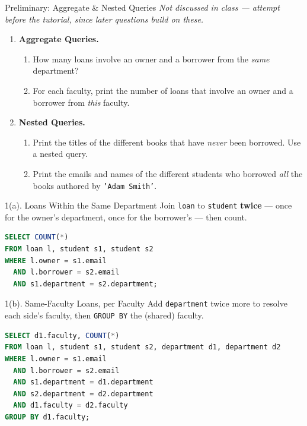 \documentclass{beamer}
\begin{document}
\begin{frame}{Preliminary: Aggregate \& Nested Queries}
\small
\textit{Not discussed in class --- attempt before the tutorial, since later questions build on these.}
\begin{enumerate}
  \item[\textbf{1.}] \textbf{Aggregate Queries.}
  \begin{enumerate}
    \item[(a)] How many loans involve an owner and a borrower from the \emph{same} department?
    \item[(b)] For each faculty, print the number of loans that involve an owner and a borrower from \emph{this} faculty.
  \end{enumerate}
  \item[\textbf{2.}] \textbf{Nested Queries.}
  \begin{enumerate}
    \item[(a)] Print the titles of the different books that have \emph{never} been borrowed. Use a nested query.
    \item[(b)] Print the emails and names of the different students who borrowed \emph{all} the books authored by \texttt{'Adam Smith'}.
  \end{enumerate}
\end{enumerate}
\end{frame}

\begin{frame}[fragile]{1(a). Loans Within the Same Department}
\small
Join \texttt{loan} to \texttt{student} \textbf{twice} --- once for the owner's department, once for the borrower's --- then count.
\begin{lstlisting}[language=SQL]
SELECT COUNT(*)
FROM loan l, student s1, student s2
WHERE l.owner = s1.email
  AND l.borrower = s2.email
  AND s1.department = s2.department;
\end{lstlisting}
\end{frame}

\begin{frame}[fragile]{1(b). Same-Faculty Loans, per Faculty}
\small
Add \texttt{department} twice more to resolve each side's faculty, then \texttt{GROUP BY} the (shared) faculty.
\begin{lstlisting}[language=SQL]
SELECT d1.faculty, COUNT(*)
FROM loan l, student s1, student s2, department d1, department d2
WHERE l.owner = s1.email
  AND l.borrower = s2.email
  AND s1.department = d1.department
  AND s2.department = d2.department
  AND d1.faculty = d2.faculty
GROUP BY d1.faculty;
\end{lstlisting}
\end{frame}
\end{document}
